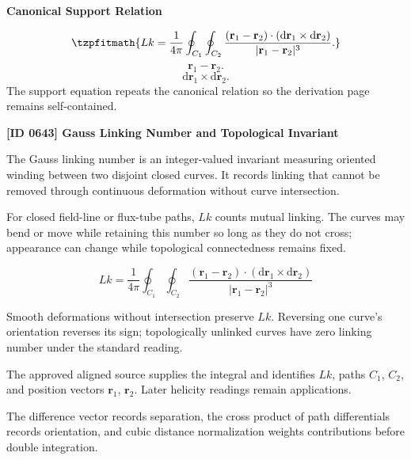 \noindent\textbf{Canonical Support Relation}\par
\[
\tzpfitmath{Lk = \frac{1}{4\pi} \oint_{C_1} \oint_{C_2} \frac{ (\mathbf{r}_1-\mathbf{r}_2) \cdot (\mathrm{d}\mathbf{r}_1\times \mathrm{d}\mathbf{r}_2) }{ |\mathbf{r}_1-\mathbf{r}_2|^3 }.}
\]
\[
\mathbf{r}_1-\mathbf{r}_2.
\]
\[
\mathrm{d}\mathbf{r}_1\times \mathrm{d}\mathbf{r}_2.
\]
\noindent The support equation repeats the canonical relation so the derivation page remains self-contained.\par

\clearpage
\noindent\textbf{[ID 0643] Gauss Linking Number and Topological Invariant}\par
\vspace{0.35em}
\begingroup\small


The Gauss linking number is an integer-valued invariant measuring oriented winding between two disjoint closed curves. It records linking that cannot be removed through continuous deformation without curve intersection.


For closed field-line or flux-tube paths, \(Lk\) counts mutual linking. The curves may bend or move while retaining this number so long as they do not cross; appearance can change while topological connectedness remains fixed.


\[
Lk=\frac{1}{4\pi}\oint_{C_1}\oint_{C_2}\frac{(\mathbf{r}_1-\mathbf{r}_2)\cdot(\mathrm{d}\mathbf{r}_1\times\mathrm{d}\mathbf{r}_2)}{|\mathbf{r}_1-\mathbf{r}_2|^3}
\]


Smooth deformations without intersection preserve \(Lk\). Reversing one curve's orientation reverses its sign; topologically unlinked curves have zero linking number under the standard reading.


The approved aligned source supplies the integral and identifies \(Lk\), paths \(C_1\), \(C_2\), and position vectors \(\mathbf{r}_1\), \(\mathbf{r}_2\). Later helicity readings remain applications.


The difference vector records separation, the cross product of path differentials records orientation, and cubic distance normalization weights contributions before double integration.

